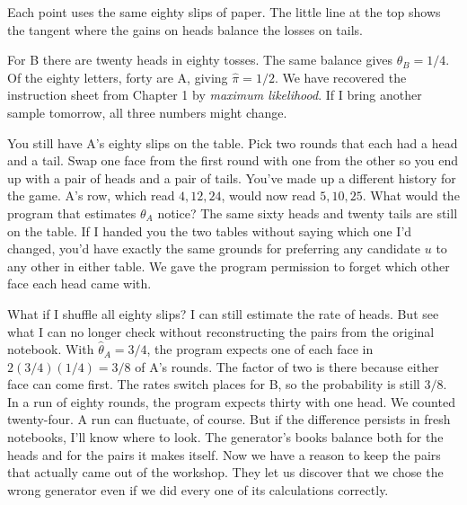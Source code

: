 \documentclass[12pt,oneside]{article}
\newcommand{\bookanchor}[1]{\phantomsection\label{#1}}
\begin{document}
\par\addvspace{5pt}\noindent\begin{minipage}{\linewidth}\centering
{}\par
{\footnotesize\raggedright Each point uses the same eighty slips of paper. The little line at the top shows the tangent where the gains on heads balance the losses on tails.\par}
\end{minipage}\par\addvspace{5pt}

For\bookanchor{topic-03-4} B there are twenty heads in eighty tosses. The same balance gives $\widehat\theta_B=1/4$. Of the eighty letters, forty are A, giving $\widehat\pi=1/2$. We have recovered the instruction sheet from Chapter 1 by \emph{maximum likelihood}. If I bring another sample tomorrow, all three numbers might change.

You still have A's eighty slips on the table. Pick two rounds that each had a head and a tail. Swap one face from the first round with one from the other so you end up with a pair of heads and a pair of tails. You've made up a different history for the game. A's row, which read $4,12,24$, would now read $5,10,25$. What would the program that estimates $\theta_A$ notice? The same sixty heads and twenty tails are still on the table. If I handed you the two tables without saying which one I'd changed, you'd have exactly the same grounds for preferring any candidate $u$ to any other in either table. We gave the program permission to forget which other face each head came with.

What if I shuffle all eighty slips? I can still estimate the rate of heads. But see what I can no longer check without reconstructing the pairs from the original notebook. With $\widehat\theta_A=3/4$, the program expects one of each face in $2(3/4)(1/4)=3/8$ of A's rounds. The factor of two is there because either face can come first. The rates switch places for B, so the probability is still $3/8$. In a run of eighty rounds, the program expects thirty with one head. We counted twenty-four. A run can fluctuate, of course. But if the difference persists in fresh notebooks, I'll know where to look. The generator's books balance both for the heads and for the pairs it makes itself. Now we have a reason to keep the pairs that actually came out of the workshop. They let us discover that we chose the wrong generator even if we did every one of its calculations correctly.
\end{document}
